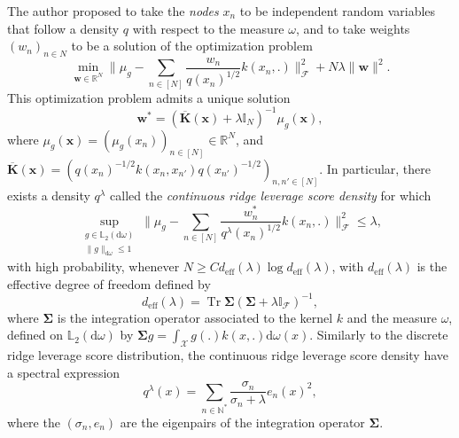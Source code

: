 \documentclass[twoside,11pt]{book}
\numberwithin{theorem}{chapter}
\numberwithin{definition}{chapter}
\numberwithin{proposition}{chapter}
\numberwithin{corollary}{chapter}
\numberwithin{example}{chapter}
\numberwithin{lemma}{chapter}
\numberwithin{assumption}{chapter}
\numberwithin{equation}{chapter}
\numberwithin{figure}{chapter}
\DeclareMathOperator{\Tr}{Tr}
\DeclareMathOperator{\eff}{\mathrm{eff}}
\DeclareMathOperator{\F}{\mathcal{F}}
\DeclareMathOperator{\X}{\mathcal{X}}
\begin{document}
The author proposed to take the \emph{nodes} $x_{n}$ to be independent random variables that follow a density $q$ with respect to the measure $\omega$, and to take weights $(w_{n})_{n \in N}$ to be a solution of the optimization problem
\begin{equation}\label{eq:introduction_reg_problem_kernel_quadrature}
\min\limits_{ \bm{w}\in \mathbb{R}^{N}} \Big\|\mu_{g} - \sum\limits_{n \in [N]} \frac{w_{n}}{q(x_{n})^{1/2}}k(x_{n},.) \Big\|_{\F}^{2} + N \lambda \|\bm{w}\|^{2}.
\end{equation}
This optimization problem admits a unique solution 
\begin{equation}
\bm{w}^{*} = (\overline{\bm{K}}(\bm{x})+\lambda \mathbb{I}_{N})^{-1}\mu_{g}(\bm{x}),
\end{equation}
where $\mu_{g}(\bm{x}) = (\mu_{g}(x_{n}))_{n \in [N]} \in \mathbb{R}^{N}$, and $\overline{\bm{K}}(\bm{x}) = (q(x_{n})^{-1/2} k(x_{n},x_{n'}) q(x_{n'})^{-1/2})_{n,n' \in [N]}$. 
In particular, there exists a density $q^{\lambda}$ called the \emph{continuous ridge leverage score density} for which 
\begin{equation}
\sup\limits_{\substack{g \in \mathbb{L}_2(\mathrm{d}\omega)\\ \|g\|_{\mathrm{d}\omega} \leq 1}} \Big \|\mu_g - \sum\limits_{n \in [N]} \frac{w_{n}^{*}}{q^{\lambda}(x_{n})^{1/2}}k(x_{n},.) \Big \|_{\F}^{2} \leq \lambda, 
\end{equation}
with high probability, whenever $N \geq C d_{\eff}(\lambda) \log d_{\eff}(\lambda)$, with $d_{\eff}(\lambda)$ is the effective degree of freedom defined by
\begin{equation}
d_{\eff}(\lambda) = \Tr \bm{\Sigma}(\bm{\Sigma} + \lambda \mathbb{I}_{\F})^{-1},
\end{equation}
where $\bm{\Sigma}$ is the integration operator associated to the kernel $k$ and the measure $\omega$, defined on $\mathbb{L}_{2}(\mathrm{d}\omega)$ by $\bm{\Sigma} g = \int_{\X} g(.)k(x,.) \mathrm{d}\omega(x)$. Similarly to the discrete ridge leverage score distribution, the continuous ridge leverage score density have a spectral expression
\begin{equation}
q^{\lambda}(x) = \sum\limits_{n \in \mathbb{N}^{*}} \frac{\sigma_{n}}{\sigma_n + \lambda} e_{n}(x)^{2},
\end{equation} 
where the $(\sigma_{n},e_n)$ are the eigenpairs of the integration operator $\bm{\Sigma}$. 
\end{document}
